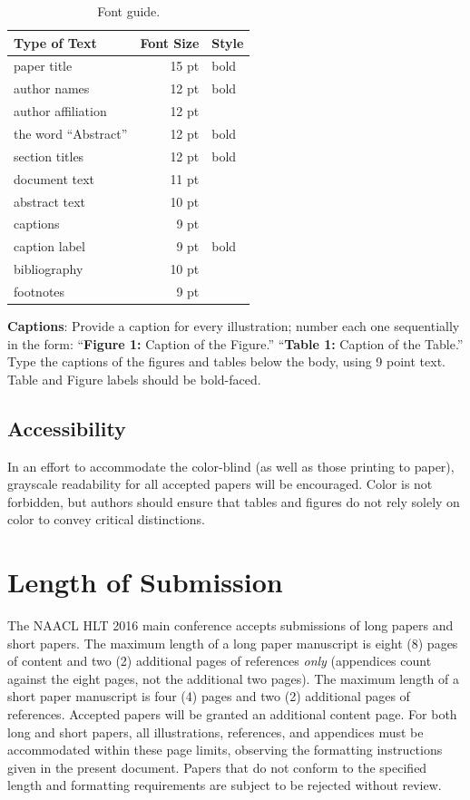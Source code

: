 \documentclass[11pt,letterpaper]{article}
\begin{document}
\begin{table}
\small
\centering
\begin{tabular}{|l|rl|}
\hline \bf Type of Text & \bf Font Size & \bf Style \\ \hline
paper title & 15 pt & bold \\
author names & 12 pt & bold \\
author affiliation & 12 pt & \\
the word ``Abstract'' & 12 pt & bold \\
section titles & 12 pt & bold \\
document text & 11 pt  &\\
abstract text & 10 pt & \\
captions & 9 pt & \\
caption label & 9 pt & bold \\
bibliography & 10 pt & \\
footnotes & 9 pt & \\
\hline
\end{tabular}
\caption{\label{font-table} Font guide.}
\end{table}

{\bf Captions}: Provide a caption for every illustration; number each one
sequentially in the form:  ``{\bf Figure 1:} Caption of the Figure.'' ``{\bf Table 1:} Caption of the Table.''  Type the captions of the figures and 
tables below the body, using 9 point text.  Table and Figure labels should be bold-faced.

\subsection{Accessibility}
\label{ssec:accessibility}

In an effort to accommodate the color-blind (as well as those printing
to paper), grayscale readability for all accepted papers will be
encouraged.  Color is not forbidden, but authors should ensure that
tables and figures do not rely solely on color to convey critical
distinctions.

\section{Length of Submission}
\label{sec:length}

The NAACL HLT 2016 main conference accepts submissions of long papers
and short papers.  The maximum length of a long paper manuscript is
eight (8) pages of content and two (2) additional pages of references
\emph{only} (appendices count against the eight pages, not the
additional two pages).  The maximum length of a short paper manuscript
is four (4) pages and two (2) additional pages of references.
Accepted papers will be granted an additional content page. For both
long and short papers, all illustrations, references, and appendices
must be accommodated within these page limits, observing the
formatting instructions given in the present document.  Papers that do
not conform to the specified length and formatting requirements are
subject to be rejected without review.
\end{document}
